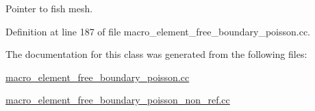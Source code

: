 Pointer to fish mesh. 



Definition at line 187 of file macro\+\_\+element\+\_\+free\+\_\+boundary\+\_\+poisson.\+cc.



The documentation for this class was generated from the following files\+:\begin{DoxyCompactItemize}
\item 
\hyperlink{macro__element__free__boundary__poisson_8cc}{macro\+\_\+element\+\_\+free\+\_\+boundary\+\_\+poisson.\+cc}\item 
\hyperlink{macro__element__free__boundary__poisson__non__ref_8cc}{macro\+\_\+element\+\_\+free\+\_\+boundary\+\_\+poisson\+\_\+non\+\_\+ref.\+cc}\end{DoxyCompactItemize}
